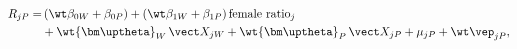 \begin{equation}\label{equation7}
	\begin{split}
		R_{jP}=&\,(\wt\beta_{0W}+\beta_{0P})+(\wt\beta_{1W}+\beta_{1P})\,\text{female ratio}_j\\
		&+\wt{\bm\uptheta}_W\,\vect X_{jW}+\wt{\bm\uptheta}_P\,\vect X_{jP}+\mu_{jP}+\wt\vep_{jP},
	\end{split}
\end{equation}